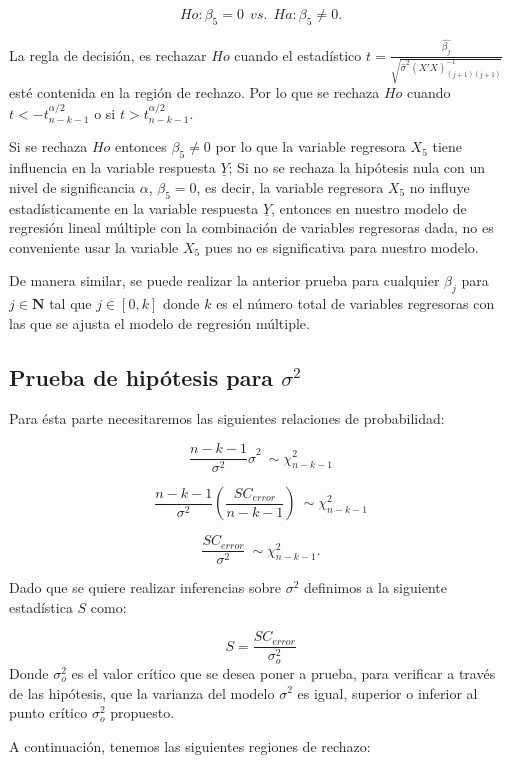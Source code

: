 \documentclass[a4paper,oneside,openany]{book}
\begin{document}
\[Ho:\beta_{5}=0 \ \ vs. \ \ Ha:\beta_{5} \neq 0.\]

La regla de decisión, es rechazar \(Ho\) cuando el estadístico
\(t=\frac{\hat{\beta_{j}}}{\sqrt{\hat{\sigma}^2(X'X)^{-1}_{(j+1)(j+1)}}}\)
esté contenida en la región de rechazo. Por lo que se rechaza \(Ho\)
cuando \(t<-t^{\alpha/2}_{n-k-1}\) o si \(t>t^{\alpha/2}_{n-k-1}.\)

Si se rechaza \(Ho\) entonces \(\beta_{5} \neq 0\) por lo que la
variable regresora \(X_{5}\) tiene influencia en la variable respuesta
\(\underline{Y}\); Si no se rechaza la hipótesis nula con un nivel de
significancia \(\alpha\), \(\beta_{5}=0\), es decir, la variable
regresora \(X_{5}\) no influye estadísticamente en la variable respuesta
\(\underline{Y}\), entonces en nuestro modelo de regresión lineal
múltiple con la combinación de variables regresoras dada, no es
conveniente usar la variable \(X_{5}\) pues no es significativa para
nuestro modelo.

De manera similar, se puede realizar la anterior prueba para cualquier
\(\beta_{j}\) para \(j \in \mathbf{N}\) tal que \(j \in [0,k]\) donde
\(k\) es el número total de variables regresoras con las que se ajusta
el modelo de regresión múltiple.

\subsection{\texorpdfstring{Prueba de hipótesis para
\(\sigma^2\)}{Prueba de hipótesis para \textbackslash{}sigma\^{}2}}\label{prueba-de-hipuxf3tesis-para-sigma2-1}

Para ésta parte necesitaremos las siguientes relaciones de probabilidad:

\[\frac{n-k-1}{\sigma^2}\hat{\sigma}^2 \ \sim \chi^{2}_{n-k-1}\]

\[\frac{n-k-1}{\sigma^2} \left( \frac{SC_{error}}{n-k-1}\right) \ \sim \chi^{2}_{n-k-1}\]

\[\frac{SC_{error}}{\sigma^2} \ \sim \chi^{2}_{n-k-1}.\]

Dado que se quiere realizar inferencias sobre \(\sigma^2\) definimos a
la siguiente estadística \(S\) como:

\[S=\frac{SC_{error}}{\sigma^2_{o}}\] Donde \(\sigma^2_{o}\) es el valor
crítico que se desea poner a prueba, para verificar a través de las
hipótesis, que la varianza del modelo \(\sigma^2\) es igual, superior o
inferior al punto crítico \(\sigma^2_{o}\) propuesto.

A continuación, tenemos las siguientes regiones de rechazo:
\end{document}
